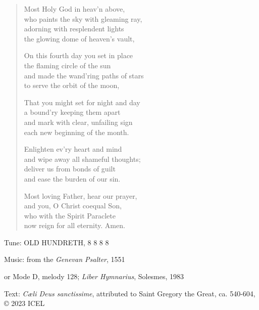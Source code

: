 \hymn

\begin{verse}
Most Holy God in heav’n above,\\
who paints the sky with gleaming ray,\\
adorning with resplendent lights\\
the glowing dome of heaven’s vault,

On this fourth day you set in place\\
the flaming circle of the sun\\
and made the wand’ring paths of stars\\
to serve the orbit of the moon,

That you might set for night and day\\
a bound’ry keeping them apart\\
and mark with clear, unfailing sign\\
each new beginning of the month.

Enlighten ev’ry heart and mind\\
and wipe away all shameful thoughts;\\
deliver us from bonds of guilt\\
and ease the burden of our sin.

Most loving Father, hear our prayer,\\
and you, O Christ coequal Son,\\
who with the Spirit Paraclete\\
now reign for all eternity. Amen.
\end{verse}

\begin{hymnsource}
Tune: OLD HUNDRETH, 8 8 8 8

Music: from the \emph{Genevan Psalter}, 1551

or Mode D, melody 128; \emph{Liber Hymnarius}, Solesmes, 1983

Text: \emph{Cæli Deus sanctissime}, attributed to Saint Gregory the Great, ca. 540-604, © 2023 ICEL
\end{hymnsource}